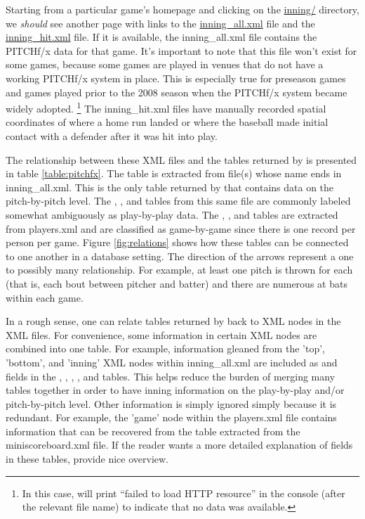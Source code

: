 \begin{article}
Starting from a particular game's homepage and clicking on the \href{http://gd2.mlb.com/components/game/mlb/year_2011/month_02/day_26/gid_2011_02_26_phimlb_nyamlb_1/inning/}{inning/}
directory, we \emph{should} see another page with links to the \href{http://gd2.mlb.com/components/game/mlb/year_2011/month_02/day_26/gid_2011_02_26_phimlb_nyamlb_1/inning/inning_all.xml}{inning\_all.xml}
file and the \href{http://gd2.mlb.com/components/game/mlb/year_2011/month_02/day_26/gid_2011_02_26_phimlb_nyamlb_1/inning/inning_hit.xml}{inning\_hit.xml}
file. If it is available, the inning\_all.xml file contains the PITCHf/x
data for that game. It's important to note that this file won't exist
for some games, because some games are played in venues that do not
have a working PITCHf/x system in place. This is especially true for
preseason games and games played prior to the 2008 season when the
PITCHf/x system became widely adopted.%
\footnote{In this case,  will print ``failed to load HTTP resource''
in the  console (after the relevant file name) to indicate
that no data was available.%
} The inning\_hit.xml files have manually recorded spatial coordinates
of where a home run landed or where the baseball made initial contact
with a defender after it was hit into play. 

The relationship between these XML files and the tables returned by
 is presented in table \ref{table:pitchfx}. The 
table is extracted from file(s) whose name ends in inning\_all.xml.
This is the only table returned by  that contains data
on the pitch-by-pitch level. The , , 
and  tables from this same file are commonly labeled somewhat
ambiguously as play-by-play data. The , ,
and  tables are extracted from players.xml and are classified
as game-by-game since there is one record per person per game. Figure
\ref{fig:relations} shows how these tables can be connected to one
another in a database setting. The direction of the arrows represent
a one to possibly many relationship. For example, at least one pitch
is thrown for each  (that is, each bout between pitcher
and batter) and there are numerous at bats within each game. 

In a rough sense, one can relate tables returned by 
back to XML nodes in the XML files. For convenience, some information
in certain XML nodes are combined into one table. For example, information
gleaned from the 'top', 'bottom', and 'inning' XML nodes within inning\_all.xml
are included as  and  fields in
the , , , , and
 tables. This helps reduce the burden of merging many
tables together in order to have inning information on the play-by-play
and/or pitch-by-pitch level. Other information is simply ignored simply
because it is redundant. For example, the 'game' node within the players.xml
file contains information that can be recovered from the 
table extracted from the miniscoreboard.xml file. If the reader wants
a more detailed explanation of fields in these tables, \citet{baseball}
provide nice overview. 


\end{article}
